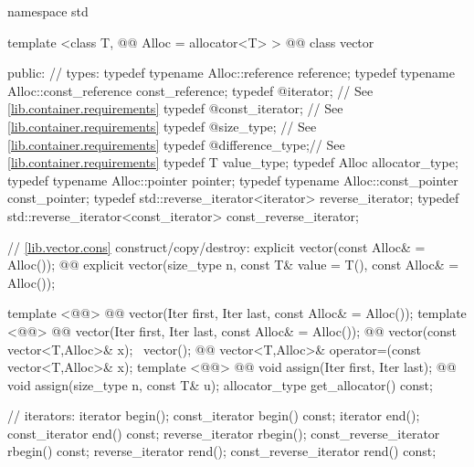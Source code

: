 \documentclass[american,twoside]{book}
\begin{document}
\begin{codeblock}
namespace std {
  template <class T, @@ Alloc = allocator<T> >
  @@
  class vector {
  public:
    // types:
    typedef typename Alloc::reference             reference;
    typedef typename Alloc::const_reference       const_reference;
    typedef @\impdef@                iterator;       // See \ref{lib.container.requirements}
    typedef @\impdef@                const_iterator; // See \ref{lib.container.requirements}
    typedef @\impdef@                size_type;      // See \ref{lib.container.requirements}
    typedef @\impdef@                difference_type;// See \ref{lib.container.requirements}
    typedef T                                     value_type;
    typedef Alloc                                 allocator_type;
    typedef typename Alloc::pointer               pointer;
    typedef typename Alloc::const_pointer         const_pointer;
    typedef std::reverse_iterator<iterator>       reverse_iterator;
    typedef std::reverse_iterator<const_iterator> const_reverse_iterator;

    // \ref{lib.vector.cons} construct/copy/destroy:
    explicit vector(const Alloc& = Alloc());
    @@
      explicit vector(size_type n, const T& value = T(), const Alloc& = Alloc());

    template <@@>
      @@
      vector(Iter first, Iter last, const Alloc& = Alloc());
    template <@@>
      @@
      vector(Iter first, Iter last, const Alloc& = Alloc());
    @@ vector(const vector<T,Alloc>& x);
   ~vector();
    @@ 
      vector<T,Alloc>& operator=(const vector<T,Alloc>& x);
    template <@@>
      @@
      void assign(Iter first, Iter last);
    @@ void assign(size_type n, const T& u);
    allocator_type get_allocator() const;

    // iterators:
    iterator               begin();
    const_iterator         begin() const;
    iterator               end();
    const_iterator         end() const;
    reverse_iterator       rbegin();
    const_reverse_iterator rbegin() const;
    reverse_iterator       rend();
    const_reverse_iterator rend() const;

}}
\end{codeblock}
\end{document}
